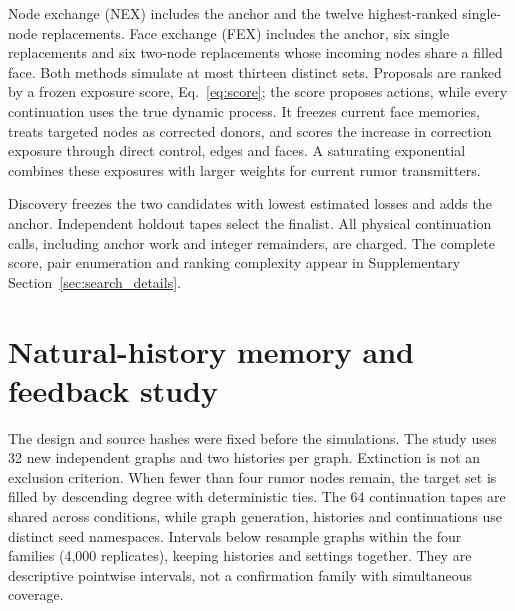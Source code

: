 \documentclass[preprint,11pt,sort&compress]{elsarticle}
\begin{document}
Node exchange (NEX) includes the anchor and the twelve highest-ranked single-node replacements. Face exchange (FEX) includes the anchor, six single replacements and six two-node replacements whose incoming nodes share a filled face. Both methods simulate at most thirteen distinct sets. Proposals are ranked by a frozen exposure score, Eq.~\ref{eq:score}; the score proposes actions, while every continuation uses the true dynamic process. It freezes current face memories, treats targeted nodes as corrected donors, and scores the increase in correction exposure through direct control, edges and faces. A saturating exponential combines these exposures with larger weights for current rumor transmitters.

Discovery freezes the two candidates with lowest estimated losses and adds the anchor. Independent holdout tapes select the finalist. All physical continuation calls, including anchor work and integer remainders, are charged. The complete score, pair enumeration and ranking complexity appear in Supplementary Section~\ref{sec:search_details}.


\section{Natural-history memory and feedback study}\label{sec:natural_memory_details}
The design and source hashes were fixed before the simulations. The study uses 32 new independent graphs and two histories per graph. Extinction is not an exclusion criterion. When fewer than four rumor nodes remain, the target set is filled by descending degree with deterministic ties. The 64 continuation tapes are shared across conditions, while graph generation, histories and continuations use distinct seed namespaces. Intervals below resample graphs within the four families (4,000 replicates), keeping histories and settings together. They are descriptive pointwise intervals, not a confirmation family with simultaneous coverage.
\end{document}
